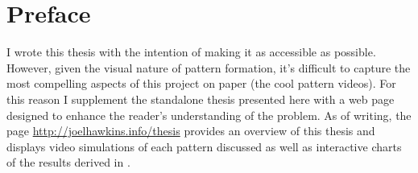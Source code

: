     \chapter*{Preface}
	I wrote this thesis with the intention of making it as accessible as possible. However, given the visual nature of pattern formation, it's difficult to capture the most compelling aspects of this project on paper (\ie the cool pattern videos). For this reason I supplement the standalone thesis presented here with a web page designed to enhance the reader's understanding of the problem. As of writing, the page \url{http://joelhawkins.info/thesis} provides an overview of this thesis and displays video simulations of each pattern discussed as well as interactive charts of the results derived in .